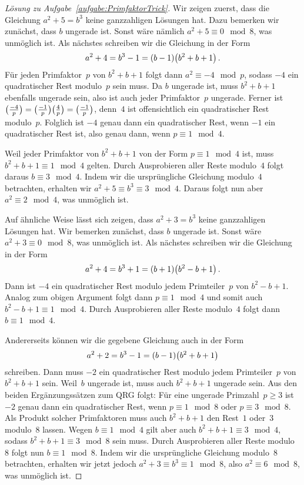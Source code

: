 \begin{proof}[Lösung zu Aufgabe~\ref{aufgabe:PrimfaktorTrick}]
	Wir zeigen zuerst, dass die Gleichung $a^2+5=b^3$ keine ganzzahligen Lösungen hat. Dazu bemerken wir zunächst, dass $b$ ungerade ist. Sonst wäre nämlich $a^2+5\equiv 0\mod 8$, was unmöglich ist. Als nächstes schreiben wir die Gleichung in der Form 
	\begin{equation*}
		a^2+4=b^3-1=(b-1)\parens*{b^2+b+1}\,.
	\end{equation*}
	Für jeden Primfaktor~$p$ von $b^2+b+1$ folgt dann $a^2\equiv -4\mod p$, sodass $-4$ ein quadratischer Rest modulo~$p$ sein muss. Da $b$ ungerade ist, muss $b^2+b+1$ ebenfalls ungerade sein, also ist auch jeder Primfaktor~$p$ ungerade. Ferner ist $\parens[\big]{\frac{-4}{p}}=\parens[\big]{\frac{-1}{p}}\parens[\big]{\frac{4}{p}}=\parens[\big]{\frac{-1}{p}}$, denn~$4$ ist offensichtlich ein quadratischer Rest modulo~$p$. Folglich ist $-4$ genau dann ein quadratischer Rest, wenn $-1$ ein quadratischer Rest ist, also genau dann, wenn $p\equiv 1\mod 4$.
	
	Weil jeder Primfaktor von $b^2+b+1$ von der Form $p\equiv1\mod 4$ ist, muss $b^2+b+1\equiv 1\mod 4$ gelten. Durch Ausprobieren aller Reste modulo~$4$ folgt daraus $b\equiv 3\mod 4$. Indem wir die ursprüngliche Gleichung modulo~$4$ betrachten, erhalten wir $a^2+5\equiv b^3\equiv 3\mod 4$. Daraus folgt nun aber $a^2\equiv 2\mod 4$, was unmöglich ist. 
	
	Auf ähnliche Weise lässt sich zeigen, dass $a^2+3=b^3$ keine ganzzahligen Lösungen hat. Wir bemerken zunächst, dass $b$ ungerade ist. Sonst wäre $a^2+3\equiv 0\mod 8$, was unmöglich ist. Als nächstes schreiben wir die Gleichung in der Form
	\begin{equation*}
		a^2+4=b^3+1=(b+1)\parens*{b^2-b+1}\,.
	\end{equation*}
	Dann ist $-4$ ein quadratischer Rest modulo jedem Primteiler~$p$ von $b^2-b+1$. Analog zum obigen Argument folgt dann $p\equiv 1\mod 4$ und somit auch $b^2-b+1\equiv 1\mod 4$. Durch Ausprobieren aller Reste modulo~$4$ folgt dann $b\equiv 1\mod 4$.
	
	Andererseits können wir die gegebene Gleichung auch in der Form
	\begin{equation*}
		a^2+2=b^3-1=(b-1)\parens*{b^2+b+1}
	\end{equation*}
	schreiben. Dann muss $-2$ ein quadratischer Rest modulo jedem Primteiler~$p$ von $b^2+b+1$ sein. Weil~$b$ ungerade ist, muss auch $b^2+b+1$ ungerade sein. Aus den beiden Ergänzungssätzen zum QRG folgt: Für eine ungerade Primzahl~$p\geqslant 3$ ist $-2$ genau dann ein quadratischer Rest, wenn $p\equiv 1\mod 8$ oder $p\equiv 3\mod 8$. Als Produkt solcher Primfaktoren muss auch $b^2+b+1$ den Rest~$1$ oder~$3$ modulo~$8$ lassen. Wegen $b\equiv 1\mod 4$ gilt aber auch $b^2+b+1\equiv 3\mod 4$, sodass $b^2+b+1\equiv 3\mod 8$ sein muss. Durch Ausprobieren aller Reste modulo~$8$ folgt nun $b\equiv 1\mod 8$. Indem wir die ursprüngliche Gleichung modulo~$8$ betrachten, erhalten wir jetzt jedoch $a^2+3\equiv b^3\equiv 1\mod 8$, also $a^2\equiv 6\mod 8$, was unmöglich ist.
\end{proof}

